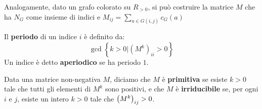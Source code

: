 \documentclass[\main/main.tex]{subfiles}
\begin{document}
\begin{multicols}{2}
\begin{definition}
    Analogamente, dato un grafo colorato su \(R_{>0}\), si può costruire la matrice \(M\) che ha \(N_G\) come insieme di indici e \(
        M_{i j}=\sum_{a \in G(i, j)} c_{G}(a)
    \)
\end{definition}
\begin{definition}[Periodo]
    Il \textbf{periodo} di un indice \(i\) è definito da:
    \[
        \operatorname{gcd}\left\{k>0 |\left(M^{k}\right)_{i i}>0\right\}
    \]
    Un indice è detto \textbf{aperiodico} se ha periodo \(1\).
\end{definition}
\begin{definition}
    Data una matrice non-negativa \(M\), diciamo che \(M\) è \textbf{primitiva} se esiste \(k>0\) tale che tutti gli elementi di \(M^k\) sono positivi, e che \(M\) è \textbf{irriducibile} se, per ogni \(i\) e \(j\), esiste un intero \(k>0\) tale che \(\left(M^k\right)_{ij}>0\).
    

\end{definition}
\end{multicols}
\end{document}
